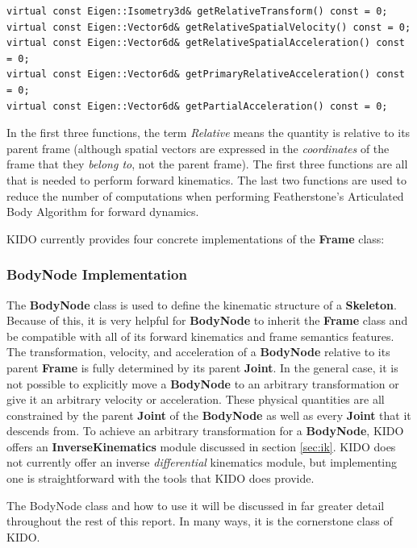 \begin{lstlisting}
virtual const Eigen::Isometry3d& getRelativeTransform() const = 0;
virtual const Eigen::Vector6d& getRelativeSpatialVelocity() const = 0;
virtual const Eigen::Vector6d& getRelativeSpatialAcceleration() const = 0;
virtual const Eigen::Vector6d& getPrimaryRelativeAcceleration() const = 0;
virtual const Eigen::Vector6d& getPartialAcceleration() const = 0;
\end{lstlisting}

In the first three functions, the term \textit{Relative} means the quantity is relative to its parent frame (although spatial vectors are expressed in the \textit{coordinates} of the frame that they \textit{belong to}, not the parent frame). The first three functions are all that is needed to perform forward kinematics. The last two functions are used to reduce the number of computations when performing Featherstone's Articulated Body Algorithm for forward dynamics.

KIDO currently provides four concrete implementations of the \textbf{Frame} class:

\subsubsection{BodyNode Implementation}

The \textbf{BodyNode} class is used to define the kinematic structure of a \textbf{Skeleton}. Because of this, it is very helpful for \textbf{BodyNode} to inherit the \textbf{Frame} class and be compatible with all of its forward kinematics and frame semantics features. The transformation, velocity, and acceleration of a \textbf{BodyNode} relative to its parent \textbf{Frame} is fully determined by its parent \textbf{Joint}. In the general case, it is not possible to explicitly move a \textbf{BodyNode} to an arbitrary transformation or give it an arbitrary velocity or acceleration. These physical quantities are all constrained by the parent \textbf{Joint} of the \textbf{BodyNode} as well as every \textbf{Joint} that it descends from. To achieve an arbitrary transformation for a \textbf{BodyNode}, KIDO offers an \textbf{InverseKinematics} module discussed in section \ref{sec:ik}. KIDO does not currently offer an inverse \textit{differential} kinematics module, but implementing one is straightforward with the tools that KIDO does provide.

The BodyNode class and how to use it will be discussed in far greater detail throughout the rest of this report. In many ways, it is the cornerstone class of KIDO.

